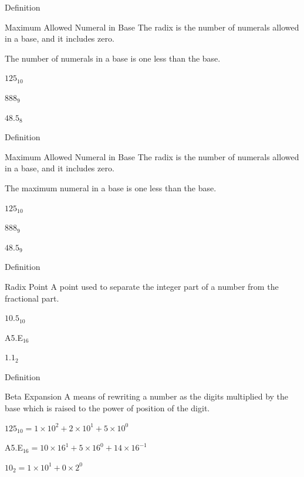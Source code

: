 \documentclass{beamer}
\begin{document}
\begin{frame}{Definition}
  \begin{block}{Maximum Allowed Numeral in Base}
    The radix is the number of numerals allowed in a base, and it includes zero. \pause

    The number of numerals in a base is one less than the base.
  \end{block}\pause

  \begin{example}\pause
    $125_{10}$ \pause

    $888_9$ \pause

    $48.5_8$
  \end{example}
\end{frame}
\begin{frame}{Definition}
  \addtocounter{framenumber}{-1}
  \begin{block}{Maximum Allowed Numeral in Base}
    The radix is the number of numerals allowed in a base, and it includes zero.

    The maximum numeral in a base is one less than the base.
  \end{block}

  \begin{example}
    $125_{10}$

    $888_9$

    $48.5_9$
  \end{example}
\end{frame}

\begin{frame}{Definition}
  \begin{block}{Radix Point}
    A point used to separate the integer part of a number from the fractional part.
  \end{block}\pause

  \begin{example}\pause
      $10.5_{10}$ \pause

      A5.E$_{16}$ \pause

      $1.1_2$
  \end{example}
\end{frame}

\begin{frame}{Definition}
  \begin{block}{Beta Expansion}
    A means of rewriting a number as the digits multiplied by the base which is raised to the power of position of the digit.
  \end{block}\pause

  \begin{example}\pause
    $125_{10} = 1\times10^2 + 2\times10^1 + 5\times10^0$ \pause

    A5.E$_{16} = 10\times16^1 + 5\times16^0 + 14\times16^{-1}$ \pause

    $10_2 = 1\times10^1+0\times2^0$
  \end{example}
\end{frame}
\end{document}
